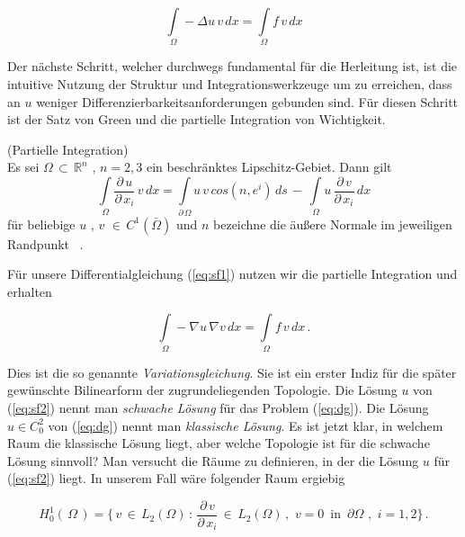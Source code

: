 \begin{equation}
\label{eq:sf1}
\int\limits_{\Omega} - \Delta u \, v  \, dx = \int\limits_{\Omega} f \, v  \, dx
\end{equation}

Der nächste Schritt, welcher durchwegs fundamental für die Herleitung ist, ist die intuitive Nutzung der Struktur und Integrationswerkzeuge um zu erreichen, dass an $u$ weniger Differenzierbarkeitsanforderungen gebunden sind. Für diesen Schritt ist der Satz von Green und die partielle Integration von Wichtigkeit.

\begin{Lemma} (Partielle Integration) \label{lemma:part} \\
Es sei $\Omega \, \subset \, \mathbb{R}^{n}$ , $n=2,3$ ein beschränktes Lipschitz-Gebiet. Dann gilt
\begin{equation*}
\int\limits_{\Omega} \dfrac{\partial \, u}{\partial \, x_i} \, v \, dx = \int\limits_{\partial \, \Omega} u \, v \, cos(n,e^i) \, ds \, - \, \int\limits_{\Omega} u \, \dfrac{\partial \, v}{\partial \, x_i} \, dx
\end{equation*}
für beliebige $u$ , $v$ $\in \, C^1(\bar{\Omega})$ und $n$ bezeichne die äußere Normale im jeweiligen Randpunkt ~\cite[139]{Numerik}.
\end{Lemma}

Für unsere Differentialgleichung (\ref{eq:sf1}) nutzen wir die partielle Integration und erhalten

\begin{equation} \label{eq:sf2}
\int\limits_{\Omega} - \nabla u \, \nabla v \, dx = \int\limits_{\Omega} f \, v \, dx \, .
\end{equation}
  
Dies ist die so genannte \textit{Variationsgleichung}. Sie ist ein erster Indiz für die später gewünschte Bilinearform der zugrundeliegenden Topologie. 
Die Lösung $u$ von (\ref{eq:sf2}) nennt man \textit{schwache Lösung} für das Problem (\ref{eq:dg}).
Die Lösung $u \in C_{0}^{2}$ von (\ref{eq:dg}) nennt man \textit{klassische Lösung}. Es ist jetzt klar, in welchem Raum die klassische Lösung liegt, aber welche Topologie ist für die schwache Lösung sinnvoll? 
Man versucht die Räume zu definieren, in der die Lösung $u$ für (\ref{eq:sf2}) liegt. In unserem Fall wäre folgender Raum ergiebig

\begin{equation*}
	H_{0}^{1}(\, \Omega\, ) = \{ \, v \, \in \, L_{2}(\Omega) \, : \, \dfrac{\partial \, v}{\partial \, x_{i}}  \, \in \, L_{2}(\Omega) \, , \, \, v=0 \, \text{ in } \, \partial \Omega \text{ , } \,  i=1,2 \} \, .
\end{equation*}

